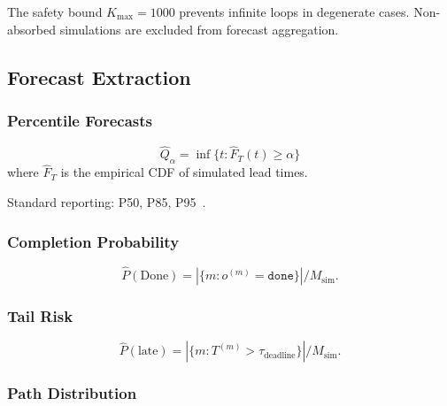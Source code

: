 The safety bound $K_{\max} = 1000$ prevents infinite loops in degenerate
cases. Non-absorbed simulations are excluded from forecast aggregation.


\subsection{Forecast Extraction}
\label{sec:s4-forecasts}

\subsubsection{Percentile Forecasts}

\begin{definition}
\label{def:percentile-forecast}
\begin{equation}
\label{eq:percentile}
\hat{Q}_\alpha = \inf \{t : \hat{F}_T(t) \geq \alpha\}
\end{equation}
where $\hat{F}_T$ is the empirical CDF of simulated lead times.
\end{definition}

Standard reporting: P50, P85, P95~\cite{vacanti2015}.

\subsubsection{Completion Probability}

\begin{equation}
\label{eq:completion-prob}
\hat{P}(\text{Done}) = |\{m : o^{(m)} = \texttt{done}\}| / M_{\text{sim}}.
\end{equation}

\subsubsection{Tail Risk}

\begin{definition}
\label{def:tail-risk}
\begin{equation}
\label{eq:tail-risk}
\hat{P}(\text{late}) = |\{m : T^{(m)} > \tau_{\text{deadline}}\}| / M_{\text{sim}}.
\end{equation}
\end{definition}

\subsubsection{Path Distribution}

